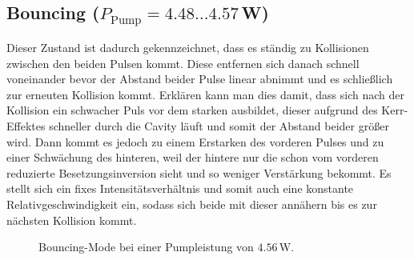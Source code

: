 \documentclass[bachelor,       %
               twoside,        %
               BCOR10mm,       %
               english,ngerman, %
               ]{GAUBM}
\begin{document}
\subsection{Bouncing ($P_\text{Pump}=4.48\dots4.57\,$W)}
Dieser Zustand ist dadurch gekennzeichnet, dass es ständig zu Kollisionen zwischen den beiden Pulsen kommt.
Diese entfernen sich danach schnell voneinander bevor der Abstand beider Pulse linear abnimmt und es schließlich zur erneuten Kollision kommt.
Erklären kann man dies damit, dass sich nach der Kollision ein schwacher Puls vor dem starken ausbildet, dieser aufgrund des Kerr-Effektes schneller durch die Cavity läuft und somit der Abstand beider größer wird.
Dann kommt es jedoch zu einem Erstarken des vorderen Pulses und zu einer Schwächung des hinteren, weil der hintere nur die schon vom vorderen reduzierte Besetzungsinversion sieht und so weniger Verstärkung bekommt.
Es stellt sich ein fixes Intensitätsverhältnis und somit auch eine konstante Relativgeschwindigkeit ein, sodass sich beide mit dieser annähern bis es zur nächsten Kollision kommt.

\begin{figure}[!htb]
   \centering   
   \hfill
   \caption{Bouncing-Mode bei einer Pumpleistung von $4.56\,$W.}
   \label{fig:bouncing456}
 \end{figure}
\end{document}
